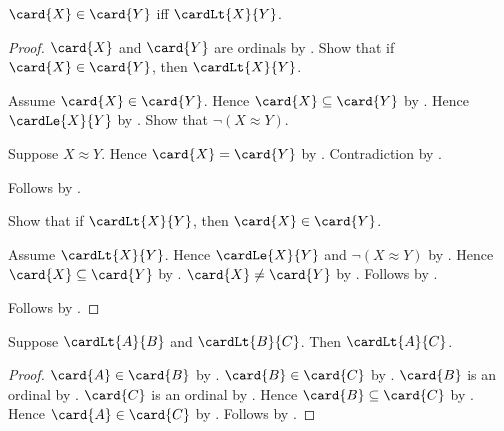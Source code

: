 \begin{theorem}\label{card_elem_iff_cardinal_lt}
    $\card{X}\in\card{Y}$ iff $\cardLt{X}{Y}$.
\end{theorem}
\begin{proof}
    $\card{X}$ and $\card{Y}$ are ordinals by .
    Show that if $\card{X}\in\card{Y}$, then $\cardLt{X}{Y}$.
    \begin{subproof}
        Assume $\card{X}\in\card{Y}$.
        Hence $\card{X}\subseteq\card{Y}$
            by .
        Hence $\cardLe{X}{Y}$ by .
        Show that $\lnot(X\approx Y)$.
        \begin{subproof}
            Suppose $X\approx Y$.
            Hence $\card{X}=\card{Y}$ by .
            Contradiction by .
        \end{subproof}
        Follows by .
    \end{subproof}
    Show that if $\cardLt{X}{Y}$, then
        $\card{X}\in\card{Y}$.
    \begin{subproof}
        Assume $\cardLt{X}{Y}$.
        Hence $\cardLe{X}{Y}$ and $\lnot(X\approx Y)$
            by .
        Hence $\card{X}\subseteq\card{Y}$
            by .
        $\card{X}\neq\card{Y}$ by .
        Follows by .
    \end{subproof}
    Follows by \auto.
\end{proof}

\begin{theorem}\label{cardinal_lt_transitive}
    Suppose $\cardLt{A}{B}$ and $\cardLt{B}{C}$.
    Then $\cardLt{A}{C}$.
\end{theorem}
\begin{proof}
    $\card{A}\in\card{B}$ by .
    $\card{B}\in\card{C}$ by .
    $\card{B}$ is an ordinal by .
    $\card{C}$ is an ordinal by .
    Hence $\card{B}\subseteq\card{C}$ by
        .
    Hence $\card{A}\in\card{C}$ by .
    Follows by .
\end{proof}

